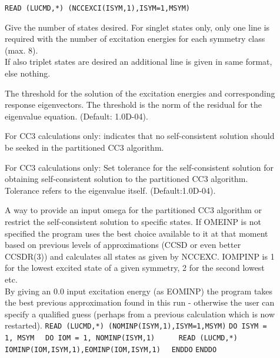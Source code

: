 \begin{description}
\item[] 

\verb|READ (LUCMD,*) (NCCEXCI(ISYM,1),ISYM=1,MSYM)|

Give the number of states desired.
For singlet states only, only one line is required with
the number of excitation energies for each symmetry class (max. 8). \\ 
If also triplet states are desired an additional line is given in same format, 
else nothing.
%
\item[] 

The threshold for the solution of the excitation energies and
corresponding response eigenvectors. 
The threshold is the norm of the residual for the eigenvalue equation.
(Default: 1.0D-04). 

%
%
%
%
%
%
\item[] 
%
For CC3 calculations only: indicates that no self-consistent solution
should be seeked in the partitioned CC3 algorithm.

%
\item[] 
%
For CC3 calculations only: 
Set tolerance for the self-consistent solution for obtaining self-consistent
solution to the partitioned CC3 algorithm.
Tolerance refers to the eigenvalue itself.
(Default:1.0D-04).


\item[] 
%
A way to provide an input omega for the partitioned CC3 algorithm or restrict
the self-consistent solution to specific states.
If OMEINP is not specified the program uses the best choice available to it at that
moment based on previous levels of approximations (CCSD or even better CCSDR(3)) 
and calculates all states as given by NCCEXC.
IOMPINP is 1 for the lowest excited state of a given symmetry, 2 for the second lowest etc. \\
By giving an 0.0 input excitation energy (as EOMINP) the program takes the best previous
approximation found in this run - otherwise the user can specify a qualified guess 
(perhaps from a previous calculation which is now restarted).\newline
\verb|READ (LUCMD,*) (NOMINP(ISYM,1),ISYM=1,MSYM)|\newline
\verb|DO ISYM = 1, MSYM|\newline
\verb|  DO IOM = 1, NOMINP(ISYM,1)|\newline
\verb|     READ (LUCMD,*) IOMINP(IOM,ISYM,1),EOMINP(IOM,ISYM,1)|\newline
\verb|  ENDDO|\newline
\verb|ENDDO|


\end{description}

